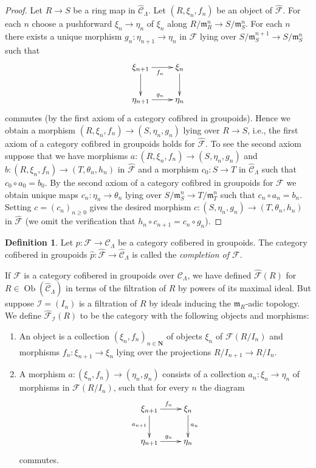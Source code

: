 \documentclass{stacks-project}
\theoremstyle{plain}
\theoremstyle{definition}
\newtheorem{definition}[subsection]{Definition}
\theoremstyle{remark}
\numberwithin{equation}{subsection}
\def\Ob{\mathop{\mathrm{Ob}}\nolimits}
\begin{document}
\begin{proof}
Let $R \to S$ be a ring map in $\widehat{\mathcal{C}}_\Lambda$.
Let $(R, \xi_n, f_n)$ be an object of $\widehat{\mathcal{F}}$.
For each $n$ choose a pushforward $\xi_n \to \eta_n$ of $\xi_n$
along $R/\mathfrak m_R^n \to S/\mathfrak m_S^n$. For each $n$ there
exists a unique morphism $g_n : \eta_{n + 1} \to \eta_n$ in $\mathcal{F}$
lying over $S/\mathfrak m_S^{n + 1} \to S/\mathfrak m_S^n$ such that
$$
\xymatrix{
\xi_{n + 1} \ar[d] \ar[r]_{f_n} & \xi_n \ar[d] \\
\eta_{n + 1} \ar[r]^{g_n} & \eta_n
}
$$
commutes (by the first axiom of a category cofibred in groupoids).
Hence we obtain a morphism $(R, \xi_n, f_n) \to (S, \eta_n, g_n)$
lying over $R \to S$, i.e., the first axiom of a category cofibred in
groupoids holds for $\widehat{\mathcal{F}}$. To see the second axiom
suppose that we have morphisms
$a : (R, \xi_n, f_n) \to (S, \eta_n, g_n)$ and
$b : (R, \xi_n, f_n) \to (T, \theta_n, h_n)$ in $\widehat{\mathcal{F}}$
and a morphism $c_0 : S \to T$ in $\widehat{\mathcal{C}}_\Lambda$ such that
$c_0 \circ a_0 = b_0$. By the second axiom of a category cofibred in groupoids
for $\mathcal{F}$ we obtain unique maps $c_n : \eta_n \to \theta_n$
lying over $S/\mathfrak m_S^n \to T/\mathfrak m_T^n$ such that
$c_n \circ a_n = b_n$. Setting $c = (c_n)_{n \geq 0}$ gives the desired
morphism $c : (S, \eta_n, g_n) \to (T, \theta_n, h_n)$ in
$\widehat{\mathcal{F}}$ (we omit the verification that
$h_n \circ c_{n + 1} = c_n \circ g_n$).
\end{proof}

\begin{definition}
\label{definition-completion}
Let $p : \mathcal{F} \to \mathcal{C}_\Lambda$ be a category cofibered in
groupoids. The category cofibered in groupoids
$\widehat{p} : \widehat{\mathcal  F} \to \widehat{\mathcal{C}}_\Lambda$
is called the {\it completion of $\mathcal{F}$}.
\end{definition}

\noindent
If $\mathcal{F}$ is a category cofibered in groupoids over $\mathcal
C_\Lambda$, we have defined $\widehat{\mathcal{F}}(R)$ for $R \in
\Ob(\widehat{\mathcal{C}}_\Lambda)$ in terms of the filtration of
$R$ by powers of its maximal ideal.  But suppose $\mathcal{I} = (I_n)$ is a
filtration of $R$ by ideals inducing the $\mathfrak{m}_R$-adic topology.  We
define $\widehat{\mathcal{F}}_\mathcal{I}(R)$ to be the category with the
following objects and morphisms:
\begin{enumerate}
\item An object is a collection $(\xi_n, f_n)_{n \in \mathbf{N}}$ of
objects $\xi_n$ of $\mathcal{F}(R/I_n)$ and morphisms
$f_n : \xi_{n + 1} \to \xi_n$ lying over the projections
$R/I_{n + 1} \to R/I_n$.
\item A morphism $a : (\xi_n, f_n) \to (\eta_n, g_n)$ consists of a
collection $a_n : \xi_n \to \eta_n$ of morphisms in
$\mathcal{F}(R/I_n)$, such that for every $n$ the diagram
$$
\xymatrix{
\xi_{n + 1} \ar[r]^{f_n} \ar[d]_{a_{n + 1}} & \xi_n \ar[d]^{a_n} \\
\eta_{n + 1} \ar[r]^{g_n} & \eta_n
}
$$
commutes.
\end{enumerate}
\end{document}
